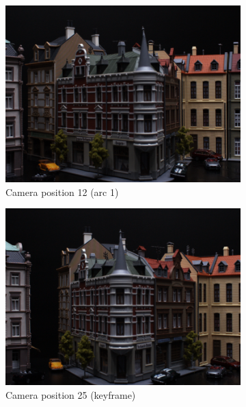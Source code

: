 \documentclass[thesis.tex]{subfiles}
\begin{document}
\begin{figure}[tb]
	\centering
	\begin{subfigure}[t]{0.32\textwidth}
		\includegraphics[width=\textwidth]{img/scene_04_img12_00.png}
		\caption{Camera position 12 (arc 1)}
		\label{fig:viewpoint_example_left}
	\end{subfigure}
	\begin{subfigure}[t]{0.32\textwidth}
		\includegraphics[width=\textwidth]{img/scene_04_img25_00.png}
		\caption{Camera position 25 (keyframe)}
		\label{fig:viewpoint_example_keyframe}
	\end{subfigure}
	\begin{subfigure}[t]{0.32\textwidth}

\end{subfigure}
\end{figure}
\end{document}
